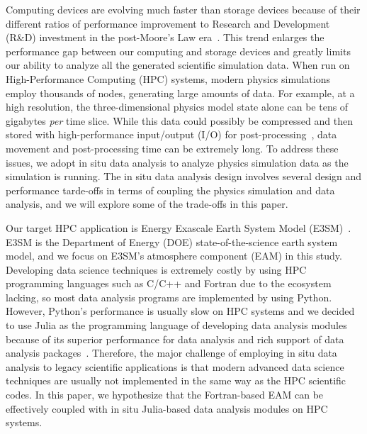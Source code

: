 \documentclass{juliacon}
\begin{document}
Computing devices are evolving much faster than storage devices because of their different ratios of performance improvement to Research and Development (R\&D) investment in the post-Moore’s Law era~\cite{thompson2018decline}. This trend enlarges the performance gap between our computing and storage devices and greatly limits our ability to analyze all the generated scientific simulation data. When run on High-Performance Computing (HPC) systems, modern physics simulations employ thousands of nodes, generating large amounts of data. For example, at a high resolution, the three-dimensional physics model state alone can be tens of gigabytes \emph{per} time slice. While this data could possibly be compressed and then stored with high-performance input/output (I/O) for post-processing~\cite{jin2022accelerating,scorpio}, data movement and post-processing time can be extremely long. To address these issues, we adopt in situ data analysis to analyze physics simulation data as the simulation is running. The in situ data analysis design involves several design and performance tarde-offs in terms of coupling the physics simulation and data analysis, and we will explore some of the trade-offs in this paper.



Our target HPC application is Energy Exascale Earth System Model (E3SM)~\cite{golaz2019doe}. E3SM is the Department of Energy (DOE) state-of-the-science earth system model, and we focus on E3SM's atmosphere component (EAM) in this study. Developing data science techniques is extremely costly by using HPC programming languages such as C/C++ and Fortran due to the ecosystem lacking, so most data analysis programs are implemented by using Python. However, Python's performance is usually slow on HPC systems and we decided to use Julia as the programming language of developing data analysis modules because of its superior performance for data analysis and rich support of data analysis packages~\cite{hunold2020benchmarking}. Therefore, the major challenge of employing in situ data analysis to legacy scientific applications is that modern advanced data science techniques are usually not implemented in the same way as the HPC scientific codes. In this paper, we hypothesize that the Fortran-based EAM can be effectively coupled with in situ Julia-based data analysis modules on HPC systems.
\end{document}
